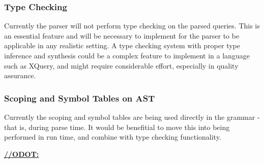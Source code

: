 \subsubsection{Type Checking}
Currently the parser will not perform type checking on the parsed queries. This
is an essential feature and will be necessary to implement for the parser to be
applicable in any realistic setting. A type checking system with proper type
inference and synthesis could be a complex feature to implement in a language
such as XQuery, and might require considerable effort, especially in quality
assurance. 

\subsubsection{Scoping and Symbol Tables on AST}
Currently the scoping and symbol tables are being used directly in the grammar -
that is, during parse time. It would be benefitial to move this into being
performed in run time, and combine with type checking functionality.

\underline{\textbf{\LARGE //ODOT:}}

